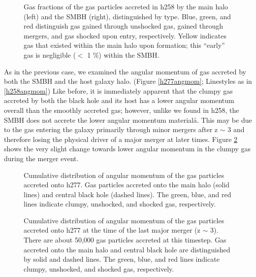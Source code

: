 \documentclass[12pt,headA,chapB]{fiskthesis}
\begin{document}
\begin{figure}[h]
\centerline{}
\caption[GASOLINE h258 Galaxy and SMBH Gas Fractions at z=0]{Gas fractions of the gas particles accreted in h258 by the main halo (left) and the SMBH (right), distinguished by type. Blue, green, and red distinguish gas gained through unshocked gas, gained through mergers, and gas shocked upon entry, respectively. Yellow indicates gas that existed within the main halo upon formation; this ``early'' gas is negligible ($<$ 1 \%) within the SMBH.}
\label{h277stackfrac} 
\end{figure}

As in the previous case, we examined the angular momentum of gas accreted by both the SMBH and the host galaxy halo. (Figure \ref{h277angmom}; Linestyles as in \ref{h258angmom}) Like before, it is immediately apparent that the clumpy gas accreted by both the black hole and its host has a lower angular momentum overall than the smoothly accreted gas; however, unlike we found in h258, the SMBH does not accrete the lower angular momentum materialå. This may be due to the gas entering the galaxy primarily through minor mergers after z $\sim$ 3 and therefore losing the physical driver of a major merger at later times. Figure \ref{h277angmom_merger} shows the very slight change towards lower angular momentum in the clumpy gas during the merger event. 



\begin{figure}
\centerline{}
\caption[GASOLINE h258 Cumulative Angular Momentum Distribution]{ Cumulative distribution of angular momentum of the gas particles accreted onto h277.  Gas particles accreted onto the main halo (solid lines) and central black hole (dashed lines). The green, blue, and red lines indicate clumpy, unshocked, and shocked gas, respectively.}
\label{h277angmom} 

\centerline{}
\caption[GASOLINE h258 Merger Angular Momentum Distribution]{ Cumulative distribution of angular momentum of the gas particles accreted onto h277 at the time of the last major merger (z $\sim$ 3). There are about 50,000 gas particles accreted at this timestep. Gas accreted onto the main halo and central black hole are distinguished by solid and dashed lines. The green, blue, and red lines indicate clumpy, unshocked, and shocked gas, respectively.}
\label{h277angmom_merger} 
\end{figure}
\end{document}
